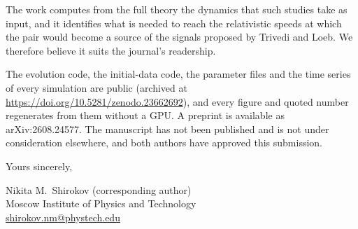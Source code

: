 \documentclass[11pt]{article}
\begin{document}
The work computes from the full theory the dynamics that such studies take as input, and it identifies what is needed to reach the relativistic speeds at which the pair would become a source of the signals proposed by Trivedi and Loeb. We therefore believe it suits the journal's readership.

The evolution code, the initial-data code, the parameter files and the time series of every simulation are public (archived at \url{https://doi.org/10.5281/zenodo.23662692}), and every figure and quoted number regenerates from them without a GPU. A preprint is available as arXiv:2608.24577. The manuscript has not been published and is not under consideration elsewhere, and both authors have approved this submission.

Yours sincerely,

Nikita M.\ Shirokov (corresponding author)\\
Moscow Institute of Physics and Technology\\
\href{mailto:shirokov.nm@phystech.edu}{shirokov.nm@phystech.edu}
\end{document}
